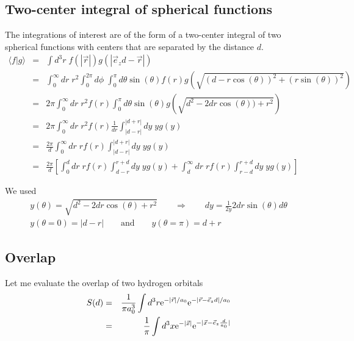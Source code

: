 \documentclass[11pt,a4paper]{report}
\begin{document}
\subsection{Two-center integral of spherical functions}
The integrations of interest are of the form of a two-center integral
of two spherical functions with centers that are separated by the
distance $d$.
\begin{eqnarray}
\langle{f}|g\rangle&=&\int d^3r\;f(|\vec{r}|)g(|\vec{e}_zd-\vec{r}|)
\nonumber\\
&=&\int_0^\infty dr\;r^2\int_0^{2\pi} d\phi\; \int_0^{\pi}d\theta\sin(\theta)
f(r) g(\sqrt{(d-r\cos(\theta))^2+(r\sin(\theta))^2})
\nonumber\\
&=&2\pi\int_0^\infty dr\;r^2 f(r)\int_0^{\pi}d\theta\sin(\theta)
g(\sqrt{d^2-2dr\cos(\theta))+r^2})
\nonumber\\
&=&2\pi\int_0^\infty dr\;r^2 f(r)\frac{1}{dr}\int_{|d-r|}^{|d+r|}dy\;yg(y)
\nonumber\\
&=&\frac{2\pi}{d}
\int_0^\infty dr\;r f(r)\int_{|d-r|}^{|d+r|}dy\;y g(y)
\nonumber\\
&=&\frac{2\pi}{d}
\left[
\int_0^d dr\;r f(r)\int_{d-r}^{r+d}dy\;y g(y)
+\int_d^\infty dr\;r f(r)\int_{r-d}^{r+d}dy\;y g(y)
\right]
\end{eqnarray}

We used
\begin{eqnarray}
y(\theta)=\sqrt{d^2-2dr \cos(\theta)+r^2}
\qquad\Rightarrow \qquad dy=\frac{1}{2y} 2dr\sin(\theta)d\theta
\nonumber\\
y(\theta=0)=|d-r|\qquad\text{and}\qquad y(\theta=\pi)=d+r
\end{eqnarray}

\subsection{Overlap}
Let me  evaluate the overlap of two hydrogen orbitals
\begin{eqnarray}
S(d)&=&
\frac{1}{\pi a_0^3}
\int d^3r
\mathrm{e}^{-|\vec{r}|/a_0} \mathrm{e}^{-|\vec{r}-\vec{e}_zd|/a_0}
\nonumber\\
&=&\frac{1}{\pi}
\int d^3x
\mathrm{e}^{-|\vec{x}|} \mathrm{e}^{-|\vec{x}-\vec{e}_z\frac{d}{a_0}|}
\end{eqnarray}
\end{document}

